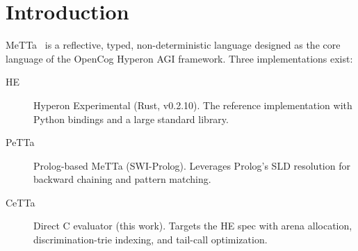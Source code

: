 \documentclass[11pt]{article}
\newcommand{\PeTTa}{\textup{PeTTa}}
\newcommand{\HE}{\textup{HE}}
\newcommand{\CeTTa}{\textup{CeTTa}}
\begin{document}
\section{Introduction}

MeTTa~\cite{metta} is a reflective, typed, non-deterministic language
designed as the core language of the OpenCog Hyperon AGI framework.
Three implementations exist:

\begin{description}
\item[\HE{}] Hyperon Experimental (Rust, v0.2.10).  The reference
  implementation with Python bindings and a large standard library.
\item[\PeTTa{}] Prolog-based MeTTa (SWI-Prolog).  Leverages Prolog's
  SLD resolution for backward chaining and pattern matching.
\item[\CeTTa{}] Direct C evaluator (this work).  Targets the \HE{} spec
  with arena allocation, discrimination-trie indexing, and tail-call
  optimization.
\end{description}
\end{document}
